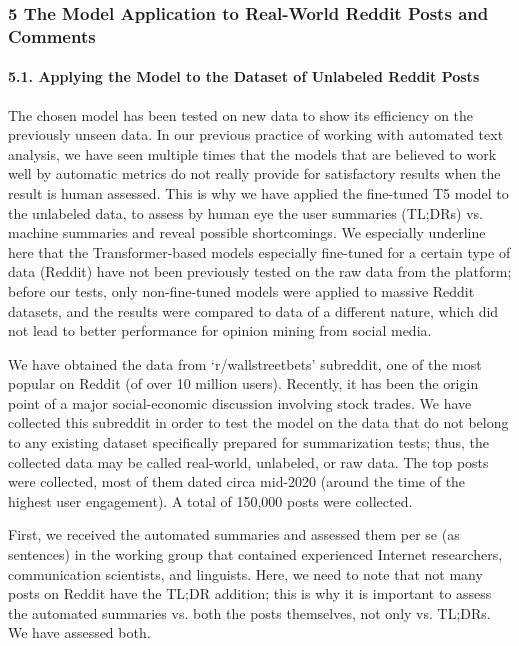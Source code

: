 \subsubsection{5 The Model Application to Real-World Reddit Posts and Comments}
\paragraph{5.1. Applying the Model to the Dataset of Unlabeled Reddit Posts}
The chosen model has been tested on new data to show its efficiency on the previously unseen data. In our previous practice of working with automated text analysis, we have seen multiple times that the models that are believed to work well by automatic metrics do not really provide for satisfactory results when the result is human assessed. This is why we have applied the fine-tuned T5 model to the unlabeled data, to assess by human eye the user summaries (TL;DRs) vs. machine summaries and reveal possible shortcomings. We especially underline here that the Transformer-based models especially fine-tuned for a certain type of data (Reddit) have not been previously tested on the raw data from the platform; before our tests, only non-fine-tuned models were applied to massive Reddit datasets, and the results were compared to data of a different nature, which did not lead to better performance for opinion mining from social media.

We have obtained the data from ‘r/wallstreetbets’ subreddit, one of the most popular on Reddit (of over 10 million users). Recently, it has been the origin point of a major social-economic discussion involving stock trades. We have collected this subreddit in order to test the model on the data that do not belong to any existing dataset specifically prepared for summarization tests; thus, the collected data may be called real-world, unlabeled, or raw data. The top posts were collected, most of them dated circa mid-2020 (around the time of the highest user engagement). A total of 150,000 posts were collected.

First, we received the automated summaries and assessed them per se (as sentences) in the working group that contained experienced Internet researchers, communication scientists, and linguists. Here, we need to note that not many posts on Reddit have the TL;DR addition; this is why it is important to assess the automated summaries vs. both the posts themselves, not only vs. TL;DRs. We have assessed both.

